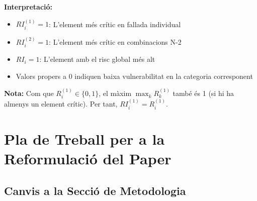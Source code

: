 \documentclass[11pt,a4paper]{article}
\begin{document}
\textbf{Interpretació:}
\begin{itemize}
    \item $RI_i^{(1)} = 1$: L'element més crític en fallada individual
    \item $RI_i^{(2)} = 1$: L'element més crític en combinacions N-2
    \item $RI_i = 1$: L'element amb el risc global més alt
    \item Valors propers a 0 indiquen baixa vulnerabilitat en la categoria corresponent
\end{itemize}

\textbf{Nota:} Com que $R_i^{(1)} \in \{0, 1\}$, el màxim $\max_k R_k^{(1)}$ també és 1 (si hi ha almenys un element crític). Per tant, $RI_i^{(1)} = R_i^{(1)}$.

\section{Pla de Treball per a la Reformulació del Paper}

\subsection{Canvis a la Secció de Metodologia}
\end{document}
